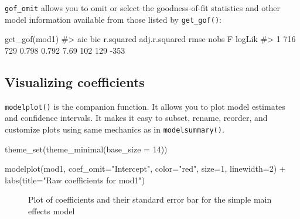 \documentclass[
  letterpaper,
  10pt,
  krantz2]{krantz}
\makeatletter
\newenvironment{Shaded}{\begin{snugshade}}{\end{snugshade}}
\newcommand{\AttributeTok}[1]{\textcolor[rgb]{0.40,0.45,0.13}{#1}}
\newcommand{\CommentTok}[1]{\textcolor[rgb]{0.37,0.37,0.37}{#1}}
\newcommand{\DecValTok}[1]{\textcolor[rgb]{0.68,0.00,0.00}{#1}}
\newcommand{\FunctionTok}[1]{\textcolor[rgb]{0.28,0.35,0.67}{#1}}
\newcommand{\NormalTok}[1]{\textcolor[rgb]{0.00,0.23,0.31}{#1}}
\newcommand{\SpecialCharTok}[1]{\textcolor[rgb]{0.37,0.37,0.37}{#1}}
\newcommand{\StringTok}[1]{\textcolor[rgb]{0.13,0.47,0.30}{#1}}
\newenvironment{kframe}{%
  \medskip{}
  \setlength{\fboxsep}{.8em}
  \def\at@end@of@kframe{}%
  \ifinner\ifhmode%
  \def\at@end@of@kframe{\end{minipage}}%
  \begin{minipage}{\columnwidth}%
  \fi\fi%
  \def\FrameCommand##1{\hskip\@totalleftmargin \hskip-\fboxsep
  \colorbox{shadecolor}{##1}\hskip-\fboxsep
      \hskip-\linewidth \hskip-\@totalleftmargin \hskip\columnwidth}%
  \MakeFramed {\advance\hsize-\width
    \@totalleftmargin\z@ \linewidth\hsize
    \@setminipage}}%
{\par\unskip\endMakeFramed%
  \at@end@of@kframe}
\renewenvironment{Shaded}{\begin{kframe}}{\end{kframe}}
\makeatother
\begin{document}
\texttt{gof\_omit} allows you to omit or select the goodness-of-fit
statistics and other model information available from those listed by
\texttt{get\_gof()}:

\begin{Shaded}
\begin{Highlighting}[]
\FunctionTok{get\_gof}\NormalTok{(mod1)}
\CommentTok{\#\textgreater{}   aic bic r.squared adj.r.squared rmse nobs   F logLik}
\CommentTok{\#\textgreater{} 1 716 729     0.798         0.792 7.69  102 129   {-}353}
\end{Highlighting}
\end{Shaded}

\subsection{Visualizing coefficients}\label{visualizing-coefficients}

\texttt{modelplot()} is the companion function. It allows you to plot
model estimates and confidence intervals. It makes it easy to subset,
rename, reorder, and customize plots using same mechanics as in
\texttt{modelsummary()}.

\begin{Shaded}
\begin{Highlighting}[]
\FunctionTok{theme\_set}\NormalTok{(}\FunctionTok{theme\_minimal}\NormalTok{(}\AttributeTok{base\_size =} \DecValTok{14}\NormalTok{))}

\FunctionTok{modelplot}\NormalTok{(mod1, }\AttributeTok{coef\_omit=}\StringTok{"Intercept"}\NormalTok{, }
          \AttributeTok{color=}\StringTok{"red"}\NormalTok{, }\AttributeTok{size=}\DecValTok{1}\NormalTok{, }\AttributeTok{linewidth=}\DecValTok{2}\NormalTok{) }\SpecialCharTok{+}
  \FunctionTok{labs}\NormalTok{(}\AttributeTok{title=}\StringTok{"Raw coefficients for mod1"}\NormalTok{)}
\end{Highlighting}
\end{Shaded}

\begin{figure}[H]


\caption{\label{fig-modelplot1}Plot of coefficients and their standard
error bar for the simple main effects model}

\end{figure}%
\end{document}
